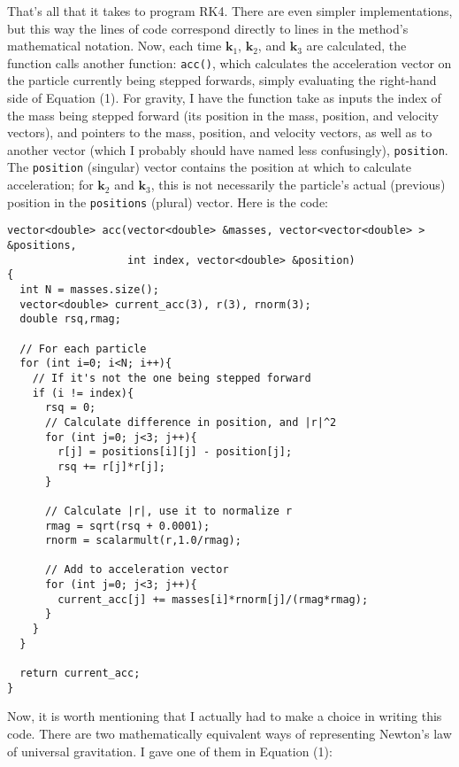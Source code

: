 \documentclass{article}
\begin{document}
That's all that it takes to program RK4. There are even simpler implementations, but this way the lines of code correspond directly to lines in the method's mathematical notation. Now, each time $\textbf{k}_1$, $\textbf{k}_2$, and $\textbf{k}_3$ are calculated, the function calls another function: \colorbox{g}{\lstinline[basicstyle=\ttfamily\footnotesize\color{black}]|acc()|}, which calculates the acceleration vector on the particle currently being stepped forwards, simply evaluating the right-hand side of Equation (1). For gravity, I have the function take as inputs the index of the mass being stepped forward (its position in the mass, position, and velocity vectors), and pointers to the mass, position, and velocity vectors, as well as to another vector (which I probably should have named less confusingly), \colorbox{g}{\lstinline[basicstyle=\ttfamily\footnotesize\color{black}]|position|}. The \colorbox{g}{\lstinline[basicstyle=\ttfamily\footnotesize\color{black}]|position|} (singular) vector contains the position at which to calculate acceleration; for $\textbf{k}_2$ and $\textbf{k}_3$, this is not necessarily the particle's actual (previous) position in the \colorbox{g}{\lstinline[basicstyle=\ttfamily\footnotesize\color{black}]|positions|} (plural) vector. Here is the code:

\linespread{1}
\begin{lstlisting}[style=CStyle,firstnumber=1]
vector<double> acc(vector<double> &masses, vector<vector<double> > &positions, 
                   int index, vector<double> &position)
{
  int N = masses.size();
  vector<double> current_acc(3), r(3), rnorm(3);
  double rsq,rmag;

  // For each particle
  for (int i=0; i<N; i++){
    // If it's not the one being stepped forward
    if (i != index){
      rsq = 0;
      // Calculate difference in position, and |r|^2
      for (int j=0; j<3; j++){
        r[j] = positions[i][j] - position[j];
        rsq += r[j]*r[j];
      }   

      // Calculate |r|, use it to normalize r
      rmag = sqrt(rsq + 0.0001);
      rnorm = scalarmult(r,1.0/rmag);

      // Add to acceleration vector
      for (int j=0; j<3; j++){
        current_acc[j] += masses[i]*rnorm[j]/(rmag*rmag);
      }   
    }   
  }

  return current_acc;
}
\end{lstlisting}
\linespread{2}

Now, it is worth mentioning that I actually had to make a choice in writing this code. There are two mathematically equivalent ways of representing Newton's law of universal gravitation. I gave one of them in Equation (1):
\end{document}
